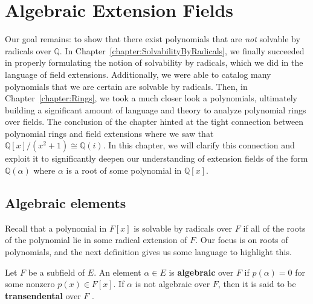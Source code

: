 \chapter{Algebraic Extension Fields}
\label{chapter:AlgebraicExtensions}
\thispagestyle{empty}


Our goal remains: to show that there exist polynomials that are \emph{not} solvable by radicals over $\mathbb{Q}$. In Chapter~\ref{chapter:SolvabilityByRadicals}, we finally succeeded in properly formulating the notion of solvability by radicals, which we did in the language of field extensions. Additionally, we were able to catalog many polynomials that we are certain are solvable by radicals. Then, in Chapter~\ref{chapter:Rings}, we took a much closer look a polynomials, ultimately building a significant amount of language and theory to analyze polynomial rings over fields. The conclusion of the chapter hinted at the tight connection between polynomial rings and field extensions where we saw that $\mathbb{Q}[x]/(x^2+1) \cong \mathbb{Q}(i)$. In this chapter, we will clarify this connection and exploit it to significantly deepen our understanding of extension fields of the form $\mathbb{Q}(\alpha)$ where $\alpha$ is a root of some polynomial in $\mathbb{Q}[x]$. 


\section{Algebraic elements}

Recall that a polynomial in $F[x]$ is solvable by radicals over $F$ if all of the roots of the polynomial lie in some radical extension of $F$. Our focus is on roots of polynomials, and the next definition gives us some language to highlight this.

\begin{definition}
Let $F$ be a subfield of $E$. An element $\alpha\in E$ is \textbf{algebraic} over $F$ if $p(\alpha) = 0$ for some nonzero $p(x)\in F[x]$. If $\alpha$ is not algebraic over  $F$, then it is said to be \textbf{transendental} over $F$ .
\end{definition}


